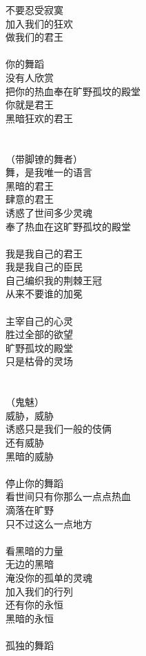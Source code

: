 不要忍受寂寞\\
加入我们的狂欢\\
做我们的君王\\
\\
你的舞蹈\\
没有人欣赏\\
把你的热血奉在旷野孤坟的殿堂\\
你就是君王\\
黑暗狂欢的君王\\
\\
\\
（带脚镣的舞者）\\
舞，是我唯一的语言\\
黑暗的君王\\
肆意的君王\\
诱惑了世间多少灵魂\\
奉了热血在这旷野孤坟的殿堂\\
\\
我是我自己的君王\\
我是我自己的臣民\\
自己编织我的荆棘王冠\\
从来不要谁的加冕\\
\\
主宰自己的心灵\\
胜过全部的欲望\\
旷野孤坟的殿堂\\
只是枯骨的灵场\\
\\
\\
（鬼魅）\\
威胁，威胁\\
诱惑只是我们一般的伎俩\\
还有威胁\\
黑暗的威胁\\
\\
停止你的舞蹈\\
看世间只有你那么一点点热血\\
滴落在旷野\\
只不过这么一点地方\\
\\
看黑暗的力量\\
无边的黑暗\\
淹没你的孤单的灵魂\\
加入我们的行列\\
还有你的永恒\\
黑暗的永恒\\
\\
孤独的舞蹈\\
